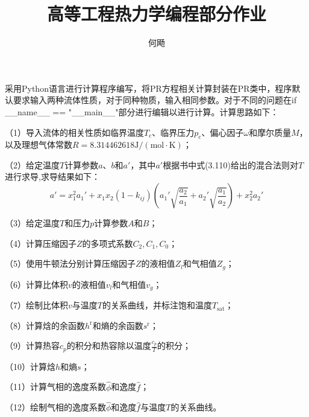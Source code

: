 \documentclass[12pt,a4paper]{article}
\title{高等工程热力学编程部分作业}
\author{何飏 \quad 3123101186}
\date{}
\begin{document}
\maketitle

采用Python语言进行计算程序编写，将PR方程相关计算封装在PR类中，程序默认要求输入两种流体性质，对于同种物质，输入相同参数。对于不同的问题在if \_\_name\_\_ == "\_\_main\_\_"部分进行编辑以进行计算。计算思路如下：

（1）导入流体的相关性质如临界温度$T_\mathrm{c}$、临界压力$p_\mathrm{c}$、偏心因子$\omega$和摩尔质量$M$，以及理想气体常数$R=8.314462618\mathrm{J/(mol\cdot K)}$；

（2）给定温度$T$计算参数$a$、$b$和$a'$，其中$a'$根据书中式(3.110)给出的混合法则对$T$进行求导,求导结果如下：
\begin{equation*}
    a'=x_1^2 a_1' + x_1 x_2 (1-k_{ij})(a_1'\sqrt{\frac{a_2}{a_1}} + a_2'\sqrt{\frac{a_1}{a_2}}) + x_2^2 a_2'
\end{equation*}

（3）给定温度$T$和压力$p$计算参数$A$和$B$；

（4）计算压缩因子$Z$的多项式系数$C_2, C_1, C_0$；

（5）使用牛顿法分别计算压缩因子$Z$的液相值$Z_l$和气相值$Z_g$；

（6）计算比体积$v$的液相值$v_l$和气相值$v_g$；

（7）绘制比体积$v$与温度$T$的关系曲线，并标注饱和温度$T_\mathrm{sat}$；

（8）计算焓的余函数$h^\mathrm{r}$和熵的余函数$s^\mathrm{r}$；

（9）计算热容$c_p$的积分和热容除以温度$\frac{c_p}{T}$的积分；

（10）计算焓$h$和熵$s$；

（11）计算气相的逸度系数$\hat{\phi}$和逸度$\hat{f}$；

（12）绘制气相的逸度系数$\hat{\phi}$和逸度$\hat{f}$与温度$T$的关系曲线。
\end{document}
